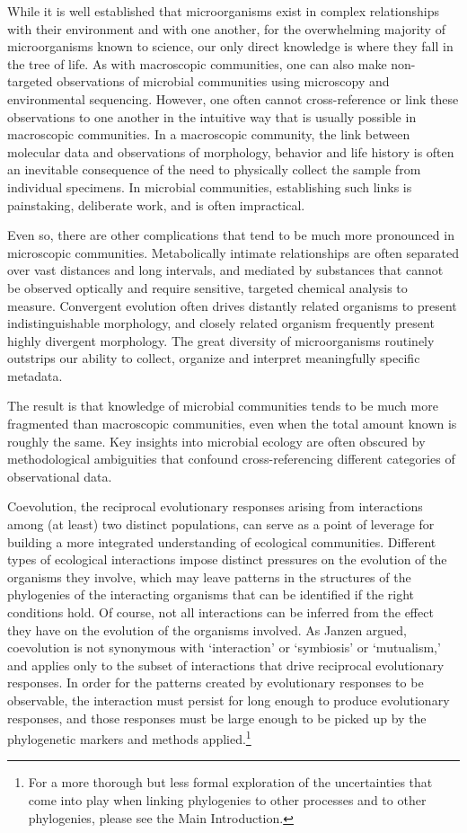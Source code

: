 While it is well established that microorganisms exist in complex relationships with their environment and with one another, for the overwhelming majority of microorganisms known to science, our only direct knowledge is where they fall in the tree of life. As with macroscopic communities, one can also make non-targeted observations of microbial communities using microscopy and environmental sequencing. However, one often cannot cross-reference or link these observations to one another in the intuitive way that is usually possible in macroscopic communities. In a macroscopic community, the link between molecular data and observations of morphology, behavior and life history is often an inevitable consequence of the need to physically collect the sample from individual specimens. In microbial communities, establishing such links is painstaking, deliberate work, and is often impractical.

Even so, there are other complications that tend to be much more pronounced in microscopic communities. Metabolically intimate relationships are often separated over vast distances and long intervals, and mediated by substances that cannot be observed optically and require sensitive, targeted chemical analysis to measure. Convergent evolution often drives distantly related organisms to present indistinguishable morphology, and closely related organism frequently present highly divergent morphology. The great diversity of microorganisms routinely outstrips our ability to collect, organize and interpret meaningfully specific metadata.

The result is that knowledge of microbial communities tends to be much more fragmented than macroscopic communities, even when the total amount known is roughly the same. Key insights into microbial ecology are often obscured by methodological ambiguities that confound cross-referencing different categories of observational data. 

Coevolution, the reciprocal evolutionary responses arising from interactions among (at least) two distinct populations, can serve as a point of leverage for building a more integrated understanding of ecological communities. Different types of ecological interactions impose distinct pressures on the evolution of the organisms they involve, which may leave patterns in the structures of the phylogenies of the interacting organisms that can be identified if the right conditions hold. \cite{gibson2015phylogenetic, bergstrom2003red, gokhale2012mutualism} Of course, not all interactions can be inferred from the effect they have on the evolution of the organisms involved. As Janzen argued, coevolution is not synonymous with `interaction' or `symbiosis' or `mutualism,' and applies only to the subset of interactions that drive reciprocal evolutionary responses. \cite{janzen1980coevolution} In order for the patterns created by evolutionary responses to be observable, the interaction must persist for long enough to produce evolutionary responses, and those responses must be large enough to be picked up by the phylogenetic markers and methods applied.\footnote{For a more thorough but less formal exploration of the uncertainties that come into play when linking phylogenies to other processes and to other phylogenies, please see the Main Introduction.}


